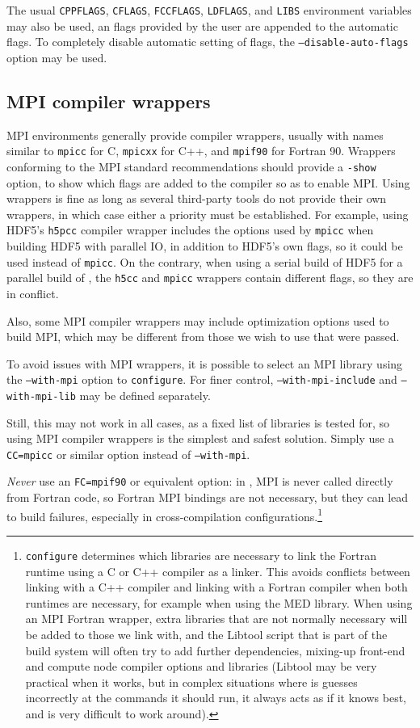 \documentclass[a4paper,10pt,twoside]{csshortdoc}
\begin{document}
The usual \texttt{CPPFLAGS}, \texttt{CFLAGS},
\texttt{FCCFLAGS}, \texttt{LDFLAGS}, and \texttt{LIBS} environment variables
may also be used, an flags provided by the user are appended to the automatic
flags. To completely disable automatic setting of flags,
the \texttt{--disable-auto-flags} option may be used.

\subsection{MPI compiler wrappers\label{sec:config:mpicc}}

MPI environments generally provide compiler wrappers, usually
with names similar to \texttt{mpicc} for C, \texttt{mpicxx} for C++,
and \texttt{mpif90} for Fortran 90. Wrappers conforming to the
MPI standard recommendations should provide a \texttt{-show}
option, to show which flags are added to the compiler so as to
enable MPI. Using wrappers is fine as long as several third-party tools
do not provide their own wrappers, in which case either
a priority must be established. For example, using HDF5's
\texttt{h5pcc} compiler wrapper includes the options used by
\texttt{mpicc} when building HDF5 with parallel IO, in addition to
HDF5's own flags, so it could be used instead of \texttt{mpicc}.
On the contrary, when using a serial build of HDF5 for a parallel
build of \CS, the \texttt{h5cc} and \texttt{mpicc} wrappers
contain different flags, so they are in conflict.

Also, some MPI compiler wrappers may include optimization options
used to build MPI, which may be different from those we wish to use
that were passed.

To avoid issues with MPI wrappers, it is possible to select an
MPI library using the \texttt{--with-mpi} option to \texttt{configure}.
For finer control, \texttt{--with-mpi-include} and \texttt{--with-mpi-lib}
may be defined separately.

Still, this may not work in all cases, as a fixed list of libraries
is tested for, so using MPI compiler wrappers is the simplest and safest
solution. Simply use a \texttt{CC=mpicc} or similar option instead
of \texttt{--with-mpi}.

\emph{Never} use an \texttt{FC=mpif90} or equivalent option:
in \CS, MPI is never called directly from Fortran code,
so Fortran MPI bindings are not necessary, but they can lead to
build failures, especially in cross-compilation
configurations.\footnote{\texttt{configure} determines which libraries are
necessary to link the Fortran runtime using a C or C++ compiler as a linker.
This avoids conflicts between linking with a C++ compiler and linking with a
Fortran compiler when both runtimes are necessary,
for example when using the MED library.
When using an MPI Fortran wrapper, extra libraries that are not normally
necessary will be added to those we link with, and the Libtool script
that is part of the build system will often try to add further dependencies,
mixing-up front-end and compute node compiler options and
libraries (Libtool may be very practical when it works, but in complex
situations where is guesses incorrectly at the commands it should run, it always
acts as if it knows best, and is very difficult to work around).}
\end{document}
